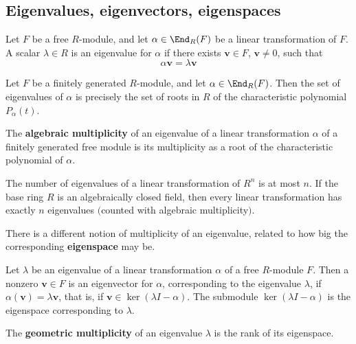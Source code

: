 \subsection{Eigenvalues, eigenvectors, eigenspaces}
\begin{definition}
Let $F$ be a free $R$-module, and let $\alpha\in\End_R(F)$ be a linear transformation of $F$. A scalar $\lambda\in R$ is an eigenvalue for $\alpha$ if there exists $\bm{v}\in F$, $\bm{v}\neq0$, such that
\[\alpha\bm{v}=\lambda\bm{v}\]
\end{definition}
\begin{lemma}
Let $F$ be a finitely generated $R$-module, and let $\alpha\in\End_R(F)$. Then the set of eigenvalues of $\alpha$ is precisely the set of roots in $R$ of the characteristic
polynomial $P_\alpha(t)$.
\end{lemma}
\begin{definition}
The \textbf{algebraic multiplicity} of an eigenvalue of a linear transformation $\alpha$ of a finitely generated free module is its multiplicity as a root of the characteristic polynomial of $\alpha$.
\end{definition}
\begin{corollary}
The number of eigenvalues of a linear transformation of $R^n$ is at most $n$. If the base ring $R$ is an algebraically closed field, then every linear transformation has exactly $n$ eigenvalues $($counted with algebraic multiplicity$)$.
\end{corollary}
There is a different notion of multiplicity of an eigenvalue, related to how big the corresponding \textbf{eigenspace} may be.
\begin{definition}
Let $\lambda$ be an eigenvalue of a linear transformation $\alpha$ of a free $R$-module $F$. Then a nonzero $\bm{v}\in F$ is an eigenvector for $\alpha$, corresponding to the eigenvalue $\lambda$, if $\alpha(\bm{v})=\lambda\bm{v}$, that is, if $\bm{v}\in\ker(\lambda I-\alpha)$. The submodule $\ker(\lambda I-\alpha)$ is the eigenspace corresponding to $\lambda$.
\end{definition}
\begin{definition}
The \textbf{geometric multiplicity} of an eigenvalue $\lambda$ is the rank of its eigenspace.
\end{definition}
